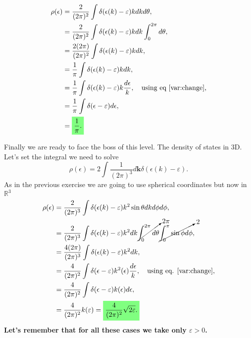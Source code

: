 \begin{questions}
\begin{solution}
\begin{equation}
  \begin{aligned}[b]
      \rho(\epsilon) &= \frac{2}{(2\pi)^2} \int  \delta(\epsilon(k) - \varepsilon)kdkd\theta,\\
       &= \frac{2}{(2\pi)^2} \int  \delta(\epsilon(k) - \varepsilon)kdk \int_0^{2\pi}d\theta,\\
       &= \frac{2(2\pi)}{(2\pi)^2} \int  \delta(\epsilon(k) - \varepsilon)kdk,\\
       &= \frac{1}{\pi} \int  \delta(\epsilon(k) - \varepsilon)kdk,\\
       &= \frac{1}{\pi} \int  \delta(\epsilon(k) - \varepsilon)k\frac{d\epsilon}{k}, \quad \text{using eq \ref{var:change},}\\
       &= \frac{1}{\pi} \int  \delta(\epsilon - \varepsilon)d\epsilon,\\
       &= \hlgreen{\frac{1}{\pi}.}
  \end{aligned}
\end{equation}
\end{solution}
\begin{solution}
  Finally we are ready to face the boss of this level. The density of states in 3D. Let's set the integral we need to solve
  \begin{equation}
    \rho(\epsilon) = 2\int \frac{1}{(2\pi)^3}d\bm{k} \delta(\epsilon(k) - \varepsilon).
  \end{equation}
  As in the previous exercise we are going to use spherical coordinates but now in $\mathbb{R}^3$
  \begin{equation}
    \begin{aligned}[b]
      \rho(\epsilon) &= \frac{2}{(2\pi)^3}\int \delta(\epsilon(k) - \varepsilon)k^2\sin\theta dkd\phi d\phi,\\
      &=  \frac{2}{(2\pi)^3}\int \delta(\epsilon(k) - \varepsilon)k^2 dk\cancelto{2\pi}{\int_0^{2\pi} d\theta} \cancelto{2}{\int_{0}^\pi\sin\phi d\phi},\\
      &=  \frac{4(2\pi)}{(2\pi)^3}\int \delta(\epsilon(k) - \varepsilon)k^2 dk,\\
      &=  \frac{4}{(2\pi)^2}\int \delta(\epsilon - \varepsilon)k^2(\epsilon) \frac{d\epsilon}{k}, \quad \text{using eq. \ref{var:change}},\\
      &=  \frac{4}{(2\pi)^2}\int \delta(\epsilon - \varepsilon)k(\epsilon) d\epsilon,\\
      &=  \frac{4}{(2\pi)^2} k(\varepsilon) = \hlgreen{\frac{4}{(2\pi)^2} \sqrt{2\varepsilon}.}\\
    \end{aligned}
  \end{equation}
  \textbf{Let's remember that for all these cases we take only $\varepsilon > 0$.}
\end{solution}
\end{questions}
